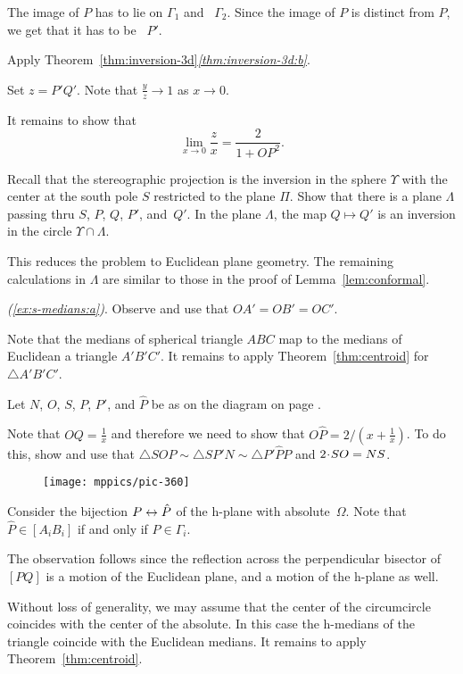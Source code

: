 The image of $P$ has to lie on $\Gamma_1$ and ~$\Gamma_2$.
Since the image of $P$ is distinct from $P$, we get that it has to be ~$P'$.

Apply Theorem~\ref{thm:inversion-3d}\textit{\ref{thm:inversion-3d:b}}.

Set $z=P'Q'$.
Note that $\tfrac yz\to 1$ as $x\to 0$.

It remains to show that 
$$\lim_{x\to 0} \frac{z}{x}=\frac{2}{1+OP^2}.$$

Recall that the stereographic projection is the inversion in the sphere $\Upsilon$ with the center at the south pole $S$ restricted to the plane $\Pi$.
Show that there is a plane $\Lambda$ passing thru $S$, $P$, $Q$, $P'$, and~$Q'$.
In the plane $\Lambda$, the map $Q\mapsto Q'$ is an inversion in the circle $\Upsilon\cap \Lambda$.

This reduces the problem to Euclidean plane geometry.
The remaining calculations in $\Lambda$ are similar to those in the proof of Lemma~\ref{lem:conformal}.

\textit{(\ref{ex:s-medians:a})}.
Observe and use that 
$OA'=OB'=OC'$.

 Note that the medians of spherical triangle $ABC$ 
map to the medians of Euclidean a triangle $A'B'C'$.
It remains to apply Theorem~\ref{thm:centroid} for $\triangle A'B'C'$.

\setcounter{eqtn}{0}

Let $N$, $O$, $S$, $P$, $P'$, and $\hat P$ 
be as on the diagram on page 
\pageref{pic:stereographic_projection-klein}.

Note that $OQ=\tfrac1x$ and therefore we need to show that $O\hat P=2/(x+\tfrac1x)$.
To do this, show and use that 
$\triangle SOP\sim \triangle SP'N\sim \triangle P'\hat PP$
and
$2\cdot SO\z=NS$.

{

\begin{wrapfigure}{r}{42mm}
\centering
\vskip-3mm
\texttt{[image: mppics/pic-360]}
\end{wrapfigure}

Consider the bijection $P\z\leftrightarrow \hat P$ of the h-plane with absolute~$\Omega$.
Note that $\hat P\in [A_iB_i]$ if and only if $P\in\Gamma_i$.

The observation follows since the reflection across the perpendicular bisector of $[PQ]$ is a motion of the Euclidean plane, and a motion of the h-plane as well.

Without loss of generality, we may assume that 
the center of the circumcircle coincides with the center of the absolute.
In this case the h-medians of the triangle coincide with the Euclidean medians.
It remains to apply Theorem~\ref{thm:centroid}.

}

